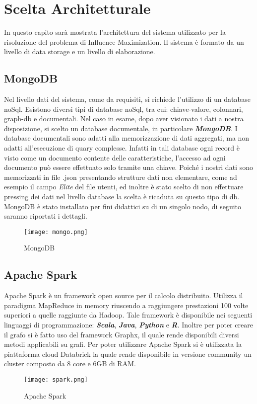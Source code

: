 
\chapter{Scelta Architetturale}
In questo capito sarà mostrata l'architettura del sistema utilizzato per
la risoluzione del problema di Influence Maximization. Il sistema è formato da un
livello di data storage e un livello di elaborazione.

\section{MongoDB}
Nel livello dati del sistema, come da requisiti, si richiede l'utilizzo di un database
noSql. Esistono diversi tipi di database noSql, tra cui: chiave-valore, colonnari,
graph-db e documentali. Nel caso in esame, dopo aver visionato i dati a nostra
disposizione, si scelto un database documentale, in particolare \textit{\textbf{MongoDB}}.
I database documentali sono adatti alla memorizzazione di dati aggregati, ma non
adatti all'esecuzione di quary complesse. Infatti in tali database ogni record è visto
come un documento contente delle caratteristiche, l'accesso ad ogni documento
può essere effettuato solo tramite una chiave. Poiché i nostri dati sono
memorizzati in file .json  presentando strutture dati non elementare, come ad
esempio il campo \textit{Elite} del file utenti, ed inoltre è stato scelto di non
effettuare pressing dei dati nel livello database la scelta è ricaduta su questo
tipo di db. MongoDB è stato installato per fini didattici su di un singolo nodo, di seguito
saranno riportati i dettagli.
\begin{figure}[!htbp]
	\texttt{[image: mongo.png]}
  \caption{MongoDB}
  \label{}
\end{figure}
\section{Apache Spark}
Apache Spark è un framework open source per il calcolo distribuito. Utilizza il
paradigma MapReduce in memory riuscendo a raggiungere prestazioni 100 volte superiori
a quelle raggiunte da Hadoop. Tale framework è disponibile nei seguenti linguaggi di
programmazione: \textit{\textbf{Scala}}, \textit{\textbf{Java}}, \textit{\textbf{Python}}
e \textit{\textbf{R}}.
Inoltre per poter creare il grafo si è fatto uso del framework Graphx, il quale
rende disponibili diversi metodi applicabili su grafi. Per poter utilizzare
Apache Spark  si è utilizzata la piattaforma cloud Databrick la quale rende
disponibile in versione community un cluster composto da 8 core e 6GB di RAM.
\begin{figure}[!htbp]
	\texttt{[image: spark.png]}
  \caption{Apache Spark}
  \label{}
\end{figure}

